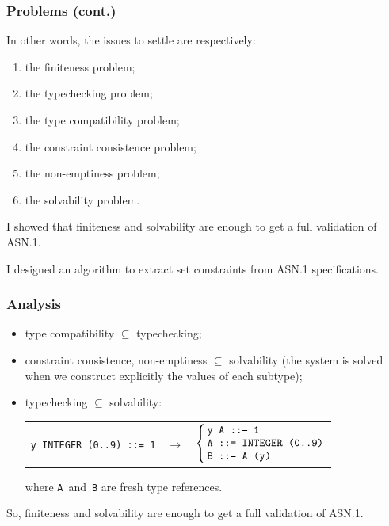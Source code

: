 \documentclass[compress,dvips,xcolor={dvipsnames},t]{beamer}
\newcommand\ASN{\textsf{ASN.1}\xspace}
\begin{document}
\begin{frame}
\frametitle{Problems (cont.)}

In other words, the issues to settle are respectively:
\begin{enumerate}

  \item the finiteness problem;

  \item the typechecking problem;

  \item the type compatibility problem;

  \item the constraint consistence problem;

  \item the non-emptiness problem;

  \item the solvability problem.

\end{enumerate}

\medskip

I showed that finiteness and solvability are enough to get a full
validation of \ASN.

\medskip

I designed an algorithm to extract set constraints from \ASN
specifications.

\end{frame}

\begin{frame}
\frametitle{Analysis}

\begin{itemize}

  \item type compatibility $\subseteq$ typechecking;

  \item constraint consistence, non-emptiness $\subseteq$ solvability
        (the system is solved when we construct explicitly the values
        of each subtype);

  \item typechecking $\subseteq$ solvability:
\begin{tabular}{@{}r@{\,}c@{\,}l@{}}
   \texttt{y INTEGER (0..9) ::= 1}
   & $\rightarrow$
   & $\left\{
       \begin{tabular}{@{\,}l@{}}
           \texttt{y A ::= 1} \\
           \texttt{A ::= INTEGER (0..9)} \\
           \texttt{B ::= A (y)}
        \end{tabular}
     \right.$
\end{tabular}
where \texttt{A}~and~\texttt{B} are fresh type references.

\end{itemize}

So, finiteness and solvability are enough to get a full validation of
\ASN.

\end{frame}
\end{document}
